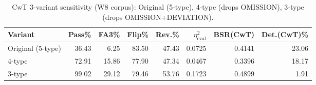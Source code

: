\begin{table}[htbp]
\centering
\caption{CwT 3-variant sensitivity (W8 corpus): Original (5-type), 4-type (drops OMISSION), 3-type (drops OMISSION+DEVIATION).}
\label{tab:cwt_3variants_w8}
\begin{tabular}{lrrrrrrr}
\toprule
Variant & Pass\% & FA3\% & Flip\% & Rev.\% & $\eta^2_{\text{eval}}$ & BSR(CwT) & Det.(CwT)\% \\
\midrule
  Original (5-type) & 36.43 & 6.25 & 83.50 & 47.43 & 0.0725 & 0.4141 & 23.06 \\
  4-type & 72.91 & 15.86 & 77.90 & 47.34 & 0.0467 & 0.3396 & 18.17 \\
  3-type & 99.02 & 29.12 & 79.46 & 53.76 & 0.1723 & 0.4899 & 1.91 \\
\bottomrule
\end{tabular}
\end{table}
